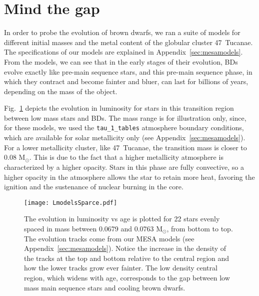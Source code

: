 \documentclass[useAMS,usenatbib]{mnras}
\begin{document}
\section{Mind the gap}
\label{sec:models}


In order to probe the evolution of brown dwarfs, we ran a suite of models \citep{2011ApJS..192....3P} for different initial masses and the metal content of the globular cluster 47~Tucanae. The specifications of our models are explained in Appendix~\ref{sec:mesamodels}. From the models, we can see that in the early stages of their evolution,  BDs evolve exactly like pre-main sequence stars, and this pre-main sequence phase, in which they contract and become fainter and bluer, can last for billions of years, depending on the mass of the object.

Fig.~\ref{fig:lmod} depicts the evolution in luminosity for stars in this transition region between low mass stars and BDs. The mass range is for illustration only, since, for these models, we used the \texttt{tau\_1\_tables} atmosphere boundary conditions, which are available for solar metallicity only (see Appendix~\ref{sec:mesamodels}). For a lower metallicity cluster, like 47~Tucanae, the transition mass is closer to 0.08 M$_\odot$. This is due to the fact that a higher metallicity atmosphere is characterized by a higher opacity. Stars in this phase are fully convective, so a higher opacity in the atmosphere allows the star to retain more heat, favoring the ignition and the sustenance of nuclear burning in the core.

\begin{figure}
  \texttt{[image: LmodelsSparce.pdf]}
  \caption{The evolution in luminosity vs age is plotted for 22 stars evenly spaced in mass between 0.0679 and 0.0763 M$_\odot$, from bottom to top. The evolution tracks come from our MESA models (see Appendix~\ref{sec:mesamodels}). Notice the increase in the density of the tracks at the top and bottom relative to the central region and how the lower tracks grow ever fainter.  The low density central region, which widens with age, corresponds to the gap between low mass main sequence stars and cooling brown dwarfs.  }\label{fig:lmod}
\end{figure}
\end{document}
